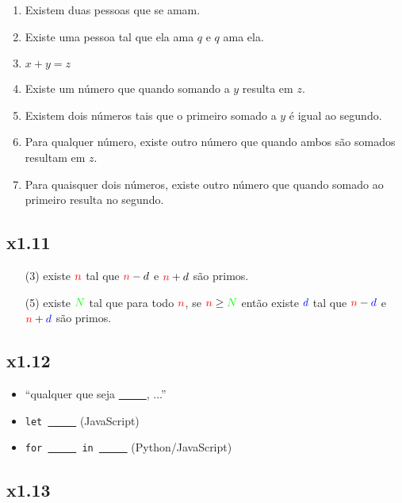 \documentclass[portuguese,a4paper,12pt]{article}
\begin{document}
	\begin{enumerate}[label=(\arabic*)]
		\item Existem duas pessoas que se amam.
		\item Existe uma pessoa tal que ela ama $q$ e $q$ ama ela.
		\item $x + y = z$
		\item Existe um número que quando somando a $y$ resulta em $z$.
		\item Existem dois números tais que o primeiro somado a $y$ é igual ao segundo.
		\item Para qualquer número, existe outro número que quando ambos são somados resultam em $z$.
		\item Para quaisquer dois números, existe outro número que quando somado ao primeiro resulta no segundo.
	\end{enumerate}
	
	\subsection*{x1.11}
	
	\begin{enumerate}[label=(\arabic*)]
		\item[(3)] existe $\textcolor{red}{n}$ tal que $\textcolor{red}{n} - d$ e $\textcolor{red}{n} + d$ são primos.
		\item[(5)] existe $\textcolor{green}{N}$ tal que para todo $\textcolor{red}{n}$, se $\textcolor{red}{n} \geq \textcolor{green}{N}$ então existe $\textcolor{blue}{d}$ tal que $\textcolor{red}{n} - \textcolor{blue}{d}$ e $\textcolor{red}{n} + \textcolor{blue}{d}$ são primos.
	\end{enumerate}
	
	\subsection*{x1.12}
	
	\begin{itemize}
		\item ``qualquer que seja \underline{\ \ \ \ \ }, ...''
		\item \texttt{let \underline{\ \ \ \ \ }} (JavaScript)
		\item \texttt{for \underline{\ \ \ \ \ } in \underline{\ \ \ \ \ }} (Python/JavaScript)
	\end{itemize}
	
	\subsection*{x1.13}
	
\end{document}
